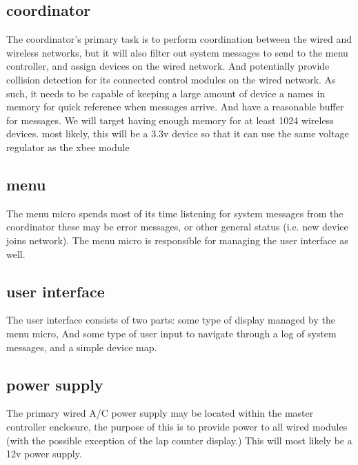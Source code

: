 \documentclass{article}
\begin{document}
     	\subsection{coordinator}
     		The coordinator's primary task is to perform coordination between the wired and wireless
     		 networks, but it will also filter out system messages to send to the menu controller,
     		 and assign devices on the wired network. And potentially provide collision detection 
     		 for its connected control modules on the wired network.
     		 As such, it needs to be capable of keeping a large amount of device a names in memory for 
     		 quick reference when messages arrive. And have a reasonable buffer for messages.
             We will target having enough memory for at least 1024 wireless devices.
             most likely, this will be a 3.3v device so that it can use the same 
             voltage regulator as the xbee module
     	\subsection{menu}
     		The menu micro spends most of its time listening for system messages from the coordinator 
     		these may be error messages, or other general status (i.e. new device joins network). The 
     		menu micro is responsible for managing the user interface as well.
     	\subsection{user interface}
     		The user interface consists of two parts: some type of display managed by the menu micro, 
     		And some type of user input to navigate through a log of system messages, and a simple 
     		device map.
     	\subsection{power supply}
     		The primary wired A/C power supply may be located within the master controller enclosure, 
     		the purpose of this is to provide power to all wired modules (with the possible exception 
     		of the lap counter display.) This will most likely be a 12v power supply.
\end{document}
